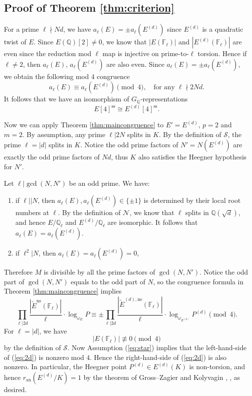 \documentclass[11pt]{amsart}
\theoremstyle{definition}
\begin{document}
\subsection{Proof of Theorem \ref{thm:criterion}}
For a prime $\ell\nmid Nd$, we have $a_\ell(E)=\pm a_\ell(E^{(d)})$ since $E^{(d)}$ is a quadratic twist of $E$. Since $E(\mathbb{Q})[2]\ne0$, we know that $|E(\mathbb{F}_\ell)|$ and $|E^{(d)}(\mathbb{F}_\ell)|$ are even since the reduction mod $\ell$ map is injective on prime-to-$\ell$ torsion. Hence if $\ell\ne2$, then $a_\ell(E)$, $a_\ell(E^{(d)})$ are also even. Since $a_\ell(E)=\pm a_\ell(E^{(d)})$, we obtain the following mod 4 congruence $$a_\ell(E)\equiv a_\ell(E^{(d)})\pmod{4},\quad \text{for any }\ell\nmid 2Nd.$$ It follows that we have an isomorphism of $G_\mathbb{Q}$-representations $$E[4]^\mathrm{ss}\cong E^{(d)}[4]^\mathrm{ss}.$$

Now we can apply Theorem \ref{thm:maincongruence} to $E'=E^{(d)}$, $p=2$ and $m=2$. By assumption, any prime $\ell| 2N$ splits in $K$. By the definition of $\mathcal{S}$, the prime $\ell=|d|$ splits in $K$. Notice the odd prime factors of $N'=N(E^{(d)})$ are exactly the odd prime factors of $Nd$, thus $K$ also satisfies the Heegner hypothesis for $N'$.

Let $\ell|\gcd(N,N')$ be an odd prime. We have:
\begin{enumerate}
\item if $\ell|| N$, then $a_\ell(E), a_\ell(E^{(d)})\in\{\pm1\}$ is determined by their local root numbers at $\ell$. By the definition of $\mathcal{N}$, we know that $\ell$ splits in $\mathbb{Q}(\sqrt{d})$, and hence $E/\mathbb{Q}_\ell$ and $E^{(d)}/\mathbb{Q}_\ell$ are isomorphic. It follows that $a_\ell(E)=a_\ell(E^{(d)})$.
\item if $\ell^2 |N$, then $a_\ell(E)=a_\ell(E^{(d)})=0$,
\end{enumerate}


Therefore $M$ is divisible by all the prime factors of $\gcd(N, N')$. Notice the odd part of $\gcd(N,N')$ equals to the odd part of $N$, so the congruence formula in Theorem \ref{thm:maincongruence} implies
\begin{equation}
  \label{eq:2d}
  \prod_{\ell|2d}\frac{|\tilde{E}^{\mathrm{ns}}(\mathbb{F}_{\ell})|}{\ell}  \cdot \log_{\omega_E}P \equiv \pm \prod_{\ell|2d}\frac{|\tilde{E}^{(d),\mathrm{ns}}(\mathbb{F}_{\ell})|}{\ell}\cdot \log_{\omega_{E^{(d)}}}P^{(d)}\pmod{4}.
\end{equation}
For $\ell=|d|$, we have $$|E(\mathbb{F}_\ell)|\not\equiv0\pmod{4}$$ by the definition of $\mathcal{S}$. Now Assumption (\ref{eq:star}) implies that the left-hand-side of (\ref{eq:2d}) is nonzero mod $4$. Hence the right-hand-side of (\ref{eq:2d}) is also nonzero. In particular, the Heegner point $P^{(d)}\in E^{(d)}(K)$ is non-torsion, and hence $r_\mathrm{an}(E^{(d)}/K)=1$ by the theorem of Gross--Zagier \cite{Gross1986} and Kolyvagin \cite{Kolyvagin1990}, \cite{Kolyvagin1988}, as desired.
\end{document}

